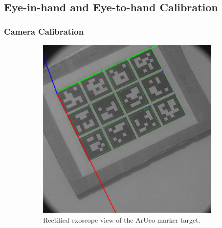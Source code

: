 \subsection{Eye-in-hand and Eye-to-hand Calibration}
\label{in:sec:eye_in_to_hand}

\subsubsection{Camera Calibration}


\begin{figure}
    \centering
    \begin{subfigure}[b]{0.49\textwidth}
        \centering
        \includegraphics[width=\textwidth]{introduction/img/aruco.png}
        \caption{Rectified exoscope view of the ArUco marker target.}
    \end{subfigure}
    \begin{subfigure}[b]{0.49\textwidth}
        \centering

\end{subfigure}
\end{figure}
